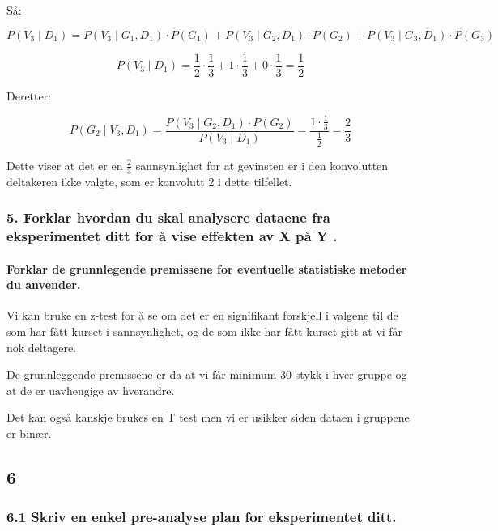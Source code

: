 \documentclass[
  12pt,
  a4paper,
  DIV=11,
  numbers=noendperiod]{scrartcl}
\let\oldparagraph\paragraph
\renewcommand{\paragraph}[1]{\oldparagraph{#1}\mbox{}}
\begin{document}
Så:

\[ 
P(V_3 \mid D_1) = P(V_3 \mid G_1, D_1) \cdot P(G_1) + P(V_3 \mid G_2, D_1) \cdot P(G_2) + P(V_3 \mid G_3, D_1) \cdot P(G_3) 
\]

\[ P(V_3 \mid D_1) = \frac{1}{2} \cdot \frac{1}{3} + 1
\cdot \frac{1}{3} + 0 \cdot \frac{1}{3} = \frac{1}{2} \]

Deretter:

\[ P(G_2 \mid V_3, D_1) = \frac{P(V_3 \mid G_2, D_1) \cdot P(G_2)}{P(V_3 \mid D_1)} = \frac{1 \cdot \frac{1}{3}}{\frac{1}{2}} = \frac{2}{3} \]

Dette viser at det er en \(\frac{2}{3}\) sannsynlighet for at gevinsten
er i den konvolutten deltakeren ikke valgte, som er konvolutt 2 i dette
tilfellet.

\clearpage

\subsubsection{5. Forklar hvordan du skal analysere dataene fra
eksperimentet ditt for å vise effekten av X på Y
.}\label{forklar-hvordan-du-skal-analysere-dataene-fra-eksperimentet-ditt-for-uxe5-vise-effekten-av-x-puxe5-y-.}

\paragraph{Forklar de grunnlegende premissene for eventuelle statistiske
metoder du
anvender.}\label{forklar-de-grunnlegende-premissene-for-eventuelle-statistiske-metoder-du-anvender.}

Vi kan bruke en z-test for å se om det er en signifikant forskjell i
valgene til de som har fått kurset i sannsynlighet, og de som ikke har
fått kurset gitt at vi får nok deltagere.

De grunnleggende premissene er da at vi får minimum 30 stykk i hver
gruppe og at de er uavhengige av hverandre.

Det kan også kanskje brukes en T test men vi er usikker siden dataen i
gruppene er binær.

\subsection{6}\label{section}

\subsubsection{6.1 Skriv en enkel pre-analyse plan for eksperimentet
ditt.}\label{skriv-en-enkel-pre-analyse-plan-for-eksperimentet-ditt.}
\end{document}
